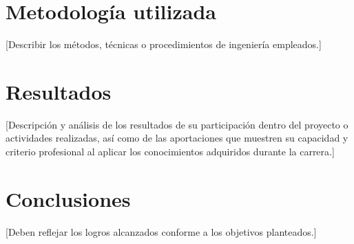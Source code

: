 \documentclass[12pt]{caltech_thesis}
\begin{document}

\chapter{Metodología utilizada}

[Describir los métodos, técnicas o procedimientos de ingeniería empleados.]


\chapter{Resultados}

[Descripción y análisis de los resultados de su participación dentro del proyecto o actividades realizadas, así como de las aportaciones que muestren su capacidad y criterio profesional al aplicar los conocimientos adquiridos durante la carrera.]


\chapter{Conclusiones}

[Deben reflejar los logros alcanzados conforme a los objetivos planteados.]

\end{document}
